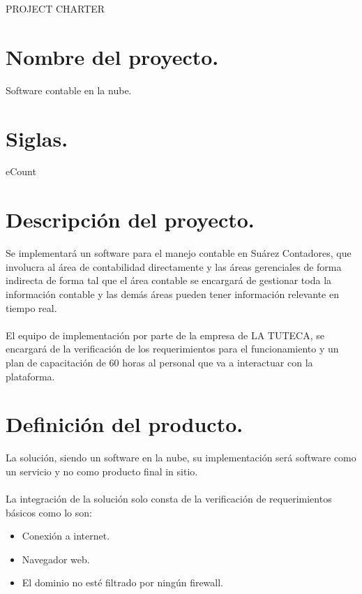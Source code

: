 \begin{center}
	\huge{PROJECT CHARTER}
\end{center}

\chapter{Nombre del proyecto.}
%
Software contable en la nube.

\chapter{Siglas.}
%
eCount

\chapter{Descripci\'on del proyecto.}
%
Se implementar\'a un software para el manejo contable en Su\'arez Contadores, que involucra al \'area de contabilidad directamente y las \'areas gerenciales de forma indirecta de forma tal 
que el \'area contable se encargar\'a de gestionar toda la informaci\'on contable y las dem\'as \'areas pueden tener informaci\'on relevante en tiempo real.\\%
%
\\El equipo de implementaci\'on por parte de la empresa de LA TUTECA, se encargar\'a
de la verificaci\'on de los requerimientos para el funcionamiento y un plan de capacitaci\'on
de 60 horas al personal que va a interactuar con la plataforma.%

\chapter{Definici\'on del producto.}
%
La soluci\'on, siendo un software en la nube, su implementaci\'on ser\'a software como un 
servicio y no como producto final in sitio.\\%
%
\\La integraci\'on de la soluci\'on solo consta de la verificaci\'on de requerimientos 
b\'asicos como lo son:%
\begin{itemize}
	\item Conexi\'on a internet.
	\item Navegador web.
	\item El dominio no est\'e filtrado por ning\'un firewall.
\end{itemize}
%
